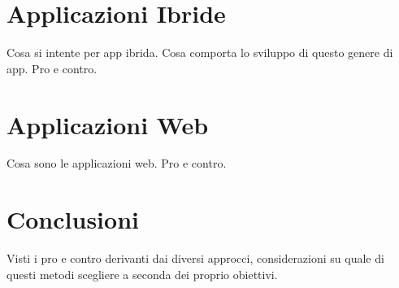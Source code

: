 	\section{Applicazioni Ibride}
		Cosa si intente per app ibrida. Cosa comporta lo sviluppo di questo
		genere di app. Pro e contro.
		
	\section{Applicazioni Web}
		Cosa sono le applicazioni web. Pro e contro.
		
	\section{Conclusioni}
		Visti i pro e contro derivanti dai diversi approcci, considerazioni su
		quale di questi metodi scegliere a seconda dei proprio obiettivi.
		
	
		
	